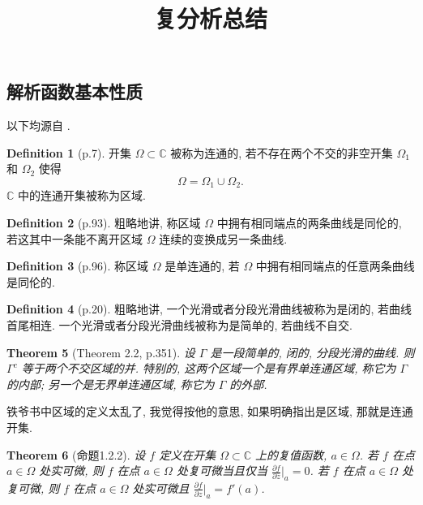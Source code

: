 \documentclass[a4paper,11pt]{article}
\title{复分析总结}
\newtheorem{theorem}{Theorem}[section]
\theoremstyle{definition}
\newtheorem{definition}[theorem]{Definition}
\begin{document}
\begin{CJK*}{UTF8}{gbsn}

\maketitle

\section{解析函数基本性质}

以下均源自 \cite{ss10}.

\begin{definition}[p.7]
    开集 $ \Omega \subset \mathbb{C} $ 被称为连通的, 若不存在两个不交的非空开集 $ \Omega_1 $ 和 $ \Omega_2 $ 使得
    $$
        \Omega = \Omega_1 \cup \Omega_2.
    $$
    $ \mathbb{C} $ 中的连通开集被称为区域.
\end{definition}

\begin{definition}[p.93]
    粗略地讲, 
    称区域 $ \Omega $ 中拥有相同端点的两条曲线是同伦的, 若这其中一条能不离开区域 $ \Omega $ 连续的变换成另一条曲线.
\end{definition}

\begin{definition}[p.96]
    称区域 $ \Omega $ 是单连通的, 若 $ \Omega $ 中拥有相同端点的任意两条曲线是同伦的.
\end{definition}


\begin{definition}[p.20]
    粗略地讲, 
    一个光滑或者分段光滑曲线被称为是闭的, 若曲线首尾相连.    
    一个光滑或者分段光滑曲线被称为是简单的, 若曲线不自交.
\end{definition}

\begin{theorem}[Theorem 2.2, p.351]
    设 $ \Gamma $ 是一段简单的, 闭的, 分段光滑的曲线. 则 $ \Gamma^c $ 等于两个不交区域的并. 
    特别的, 这两个区域一个是有界单连通区域, 称它为 $ \Gamma $ 的内部;
    另一个是无界单连通区域, 称它为 $ \Gamma $ 的外部.
\end{theorem}

铁爷书中区域的定义太乱了, 我觉得按他的意思, 如果明确指出是区域, 那就是连通开集.

\begin{theorem}[命题1.2.2]
    设 $ f $ 定义在开集 $ \Omega \subset \mathbb{C} $ 上的复值函数, $ a \in \Omega $. 
    若 $ f $ 在点 $ a \in \Omega $ 处实可微, 
    则 $ f $ 在点 $ a \in \Omega $ 处复可微当且仅当 $ \frac{\partial f}{\partial \overline{z}}|_a = 0 $.
    若 $ f $ 在点 $ a \in \Omega $ 处复可微, 
    则 $ f $ 在点 $ a \in \Omega $ 处实可微且 $ \frac{\partial f}{\partial z}|_a = f'(a) $.
\end{theorem}


\end{CJK*}
\end{document}
